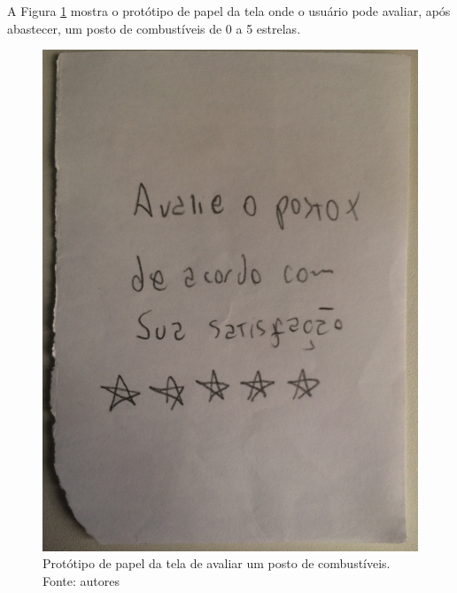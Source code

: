 A Figura \ref{img:prototipo_de_papel_avaliar_posto} mostra o protótipo de papel da tela onde o usuário pode avaliar, após abastecer, um posto de combustíveis de 0 a 5 estrelas.
\begin{figure}[H]
    \centering
    \includegraphics[scale=0.1, angle=-90]{figuras/prototipo_papel_avaliar_posto.jpg}
    \caption[Protótipo de papel da tela de avaliar um posto de combustíveis]{Protótipo de papel da tela de avaliar um posto de combustíveis. Fonte: autores}
    \label{img:prototipo_de_papel_avaliar_posto}
\end{figure}
 \pagebreak

